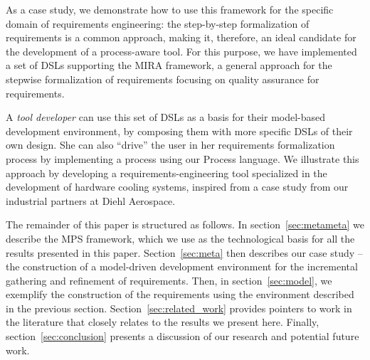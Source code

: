 As a case study, we demonstrate how to use this framework for the
specific domain of requirements engineering: the step-by-step formalization of requirements is a common approach,
making it, therefore, an ideal candidate for the development of a process-aware tool.
For this purpose, we have implemented a set of DSLs supporting the MIRA
\cite{MIRA13} framework, a general approach for the stepwise formalization of requirements
focusing on quality assurance for requirements.

A \emph{tool developer} can use this set of DSLs as a basis for their
model-based development environment, by composing them with more specific DSLs
of their own design. She can also ``drive'' the user in her requirements
formalization process by implementing a process using our \textsf{Process} language.
We illustrate this approach by developing a requirements-engineering tool
specialized in the development of hardware cooling systems, inspired from a case
study from our industrial partners at Diehl Aerospace.


The remainder of this paper is structured as follows.  In
section~\ref{sec:metameta} we describe the MPS framework, which we use as the
technological basis for all the results presented in this paper.
Section~\ref{sec:meta} then describes our case study -- the construction of a
model-driven development environment for the incremental gathering and
refinement of requirements. Then, in section~\ref{sec:model}, we exemplify the
construction of the requirements using the environment described in the previous
section. Section~\ref{sec:related_work} provides pointers to work in the
literature that closely relates to the results we present here. Finally,
section~\ref{sec:conclusion} presents a discussion of our research and potential
future work.
\vspace{-.5cm}

